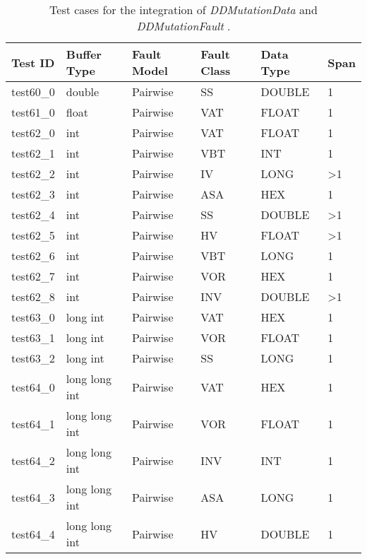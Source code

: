 
\setlength\LTleft{0pt}
\setlength\LTright{0pt}
\scriptsize

\begin{longtable}{|l|l|l|l|l|l|}

\caption{Test cases for the integration of \emph{DDMutationData} and \emph{DDMutationFault} .}
\label{table:matrix_Pairwise} \\

\hline
\textbf{Test ID} & \textbf{Buffer Type} & \textbf{Fault Model} & \textbf{Fault Class} & \textbf{Data Type} & \textbf{Span}\\
\hline
test60\_0 & double & Pairwise & SS & DOUBLE & 1 \\
test61\_0 & float & Pairwise & VAT & FLOAT & 1 \\
test62\_0 & int & Pairwise & VAT & FLOAT & 1 \\
test62\_1 & int & Pairwise & VBT & INT & 1 \\
test62\_2 & int & Pairwise & IV & LONG & \textgreater{}1 \\
test62\_3 & int & Pairwise & ASA & HEX & 1 \\
test62\_4 & int & Pairwise & SS & DOUBLE & \textgreater{}1 \\
test62\_5 & int & Pairwise & HV & FLOAT & \textgreater{}1 \\
test62\_6 & int & Pairwise & VBT & LONG & 1 \\
test62\_7 & int & Pairwise & VOR & HEX & 1 \\
test62\_8 & int & Pairwise & INV & DOUBLE & \textgreater{}1 \\
test63\_0 & long int & Pairwise & VAT & HEX & 1 \\
test63\_1 & long int & Pairwise & VOR & FLOAT & 1 \\
test63\_2 & long int & Pairwise & SS & LONG & 1 \\
test64\_0 & long long int & Pairwise & VAT & HEX & 1 \\
test64\_1 & long long int & Pairwise & VOR & FLOAT & 1 \\
test64\_2 & long long int & Pairwise & INV & INT & 1 \\
test64\_3 & long long int & Pairwise & ASA & LONG & 1 \\
test64\_4 & long long int & Pairwise & HV & DOUBLE & 1 \\

\end{longtable}
